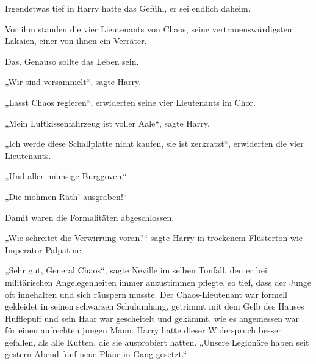 Irgendetwas tief in Harry hatte das Gefühl, er sei endlich daheim.

Vor ihm standen die vier Lieutenants von Chaos, seine vertrauenswürdigsten Lakaien, einer von ihnen ein Verräter.

Das. Genauso sollte das Leben sein.

„Wir sind versammelt“, sagte Harry.

„Lasst Chaos regieren“, erwiderten seine vier Lieutenants im Chor.

„Mein Luftkissenfahrzeug ist voller Aale“, sagte Harry.

„Ich werde diese Schallplatte nicht kaufen, sie ist zerkratzt“, erwiderten die vier Lieutenants.

„Und aller-mümsige Burggoven.“

„Die mohmen Räth' ausgraben!“

Damit waren die Formalitäten abgeschlossen.

„Wie schreitet die Verwirrung voran?“ sagte Harry in trockenem Flüsterton wie Imperator Palpatine.

„Sehr gut, General Chaos“, sagte Neville im selben Tonfall, den er bei militärischen Angelegenheiten immer anzustimmen pflegte, so tief, dass der Junge oft innehalten und sich räuspern musste. Der Chaos-Lieutenant war formell gekleidet in seinen schwarzen Schulumhang, getrimmt mit dem Gelb des Hauses Hufflepuff und sein Haar war gescheitelt und gekämmt, wie es angemessen war für einen aufrechten jungen Mann. Harry hatte dieser Widerspruch besser gefallen, als alle Kutten, die sie ausprobiert hatten. „Unsere Legionäre haben seit gestern Abend fünf neue Pläne in Gang gesetzt.“

